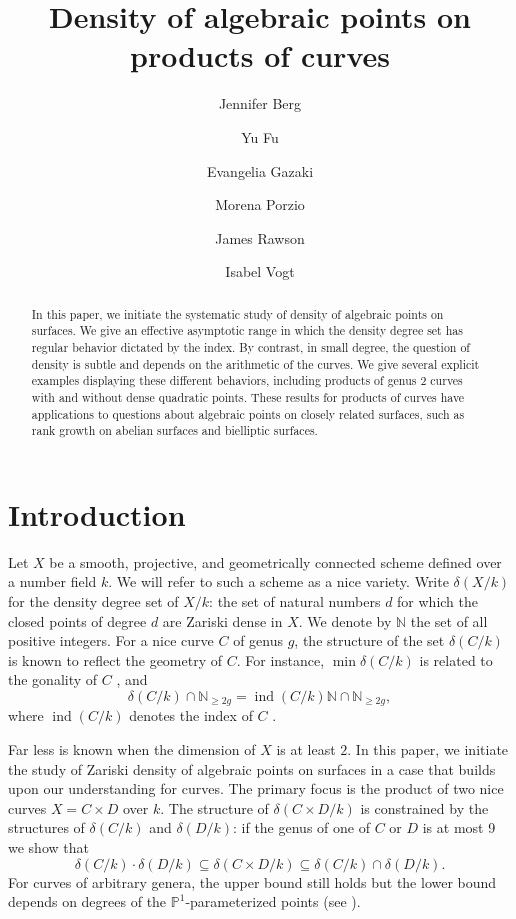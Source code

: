 \documentclass[a4paper,11pt]{amsart}
\title{Density of algebraic points on products of curves}
\author[J.~Berg]{Jennifer Berg}
\author[Y.~Fu]{Yu Fu}
\author[E.~Gazaki]{Evangelia Gazaki}
\author[M.~Porzio]{Morena Porzio}
\author[J.~Rawson]{James Rawson}
\author[I.~Vogt]{Isabel Vogt}
\theoremstyle{plain}
\theoremstyle{remark}
\newcommand{\nn}{\mathbb{N}}
\newcommand{\dendegs}{\delta}
\newcommand{\ind}{\operatorname{ind}}
\newcommand{\defi}[1]{\textsf{#1}} %
\begin{document}
\begin{abstract}
    In this paper, we initiate the systematic study of density of algebraic points on surfaces.  We  give an effective asymptotic range in which the density degree set  has regular behavior dictated by the index.  By contrast, in small degree, the question of density is subtle and depends on the arithmetic of the curves.  We give several explicit examples displaying these different behaviors, including products of genus \(2\) curves  with and without dense quadratic points. 
    These results for products of curves have applications to questions about algebraic points on closely related surfaces, such as rank growth on abelian surfaces and bielliptic surfaces.
\end{abstract}

\maketitle

\section{Introduction}

Let \(X\) be a smooth, projective, and geometrically connected scheme defined over a number field \(k\).  
We will refer to such a scheme as a \defi{nice variety}.
Write
\(\dendegs(X/k)\) for the \defi{density degree set} of \(X/k\): the set of natural numbers \(d\) for which the closed points of degree $d$ are Zariski dense in $X$. 
We denote by $\nn$ the set of all positive integers. 
For a nice curve $C$ of genus $g$, the structure of the set \(\dendegs(C/k)\) is known to reflect the geometry of \(C\).  
For instance, $\min \dendegs(C/k)$ is related to the gonality of \(C\) \cite[Corollary 5.2.2]{VV}, and 
\begin{equation}\label{eq:boundgenusdendegsetforcurve}
    \dendegs(C/k) \cap \nn_{ \geq 2g} =  \ind(C/k) \mathbb{N} \cap \nn_{ \geq 2g},
\end{equation} 
where \(\ind(C/k)\) denotes the \defi{index} of \(C\)
\cite[Proposition 5.1.1]{VV}.

Far less is known when the dimension of \(X\) is at least \(2\).  
In this paper, we initiate the study of Zariski density of algebraic points on surfaces in a case that builds upon our understanding for curves. The primary focus is the product of two nice curves \(X = C \times D\) over \(k\).  
The structure of \(\dendegs(C \times D/k)\) is constrained by the structures of \(\dendegs(C/k)\) and \(\dendegs(D/k)\): if the genus of one of \(C\) or \(D\) is at most 9 we show that
\begin{equation}\label{eq:basic_range}
\dendegs(C/k)\cdot  \dendegs(D/k) \subseteq \dendegs(C \times D/k) \subseteq \dendegs(C/k) \cap \dendegs(D/k).
\end{equation}
For curves of arbitrary genera, the upper bound still holds but the lower bound depends on degrees of the \(\mathbb{P}^1\)-parameterized points (see ).
\end{document}
